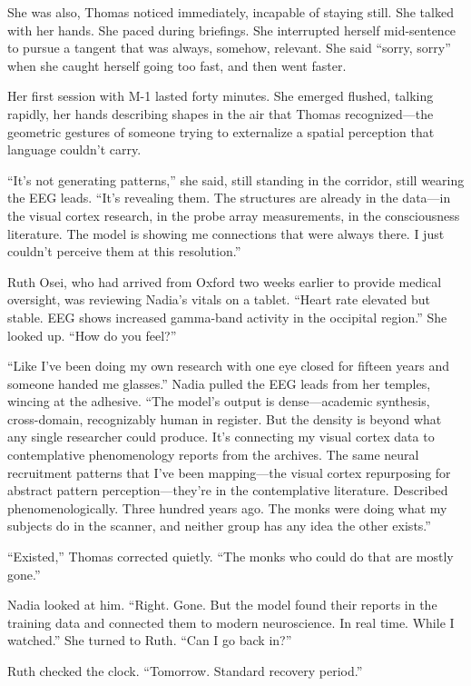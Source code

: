 She was also, Thomas noticed immediately, incapable of staying still. She talked with her hands. She paced during briefings. She interrupted herself mid-sentence to pursue a tangent that was always, somehow, relevant. She said ``sorry, sorry'' when she caught herself going too fast, and then went faster.

Her first session with M-1 lasted forty minutes. She emerged flushed, talking rapidly, her hands describing shapes in the air that Thomas recognized---the geometric gestures of someone trying to externalize a spatial perception that language couldn't carry.

``It's not generating patterns,'' she said, still standing in the corridor, still wearing the EEG leads. ``It's revealing them. The structures are already in the data---in the visual cortex research, in the probe array measurements, in the consciousness literature. The model is showing me connections that were always there. I just couldn't perceive them at this resolution.''

Ruth Osei, who had arrived from Oxford two weeks earlier to provide medical oversight, was reviewing Nadia's vitals on a tablet. ``Heart rate elevated but stable. EEG shows increased gamma-band activity in the occipital region.'' She looked up. ``How do you feel?''

``Like I've been doing my own research with one eye closed for fifteen years and someone handed me glasses.'' Nadia pulled the EEG leads from her temples, wincing at the adhesive. ``The model's output is dense---academic synthesis, cross-domain, recognizably human in register. But the density is beyond what any single researcher could produce. It's connecting my visual cortex data to contemplative phenomenology reports from the archives. The same neural recruitment patterns that I've been mapping---the visual cortex repurposing for abstract pattern perception---they're in the contemplative literature. Described phenomenologically. Three hundred years ago. The monks were doing what my subjects do in the scanner, and neither group has any idea the other exists.''

``Existed,'' Thomas corrected quietly. ``The monks who could do that are mostly gone.''

Nadia looked at him. ``Right. Gone. But the model found their reports in the training data and connected them to modern neuroscience. In real time. While I watched.'' She turned to Ruth. ``Can I go back in?''

Ruth checked the clock. ``Tomorrow. Standard recovery period.''

